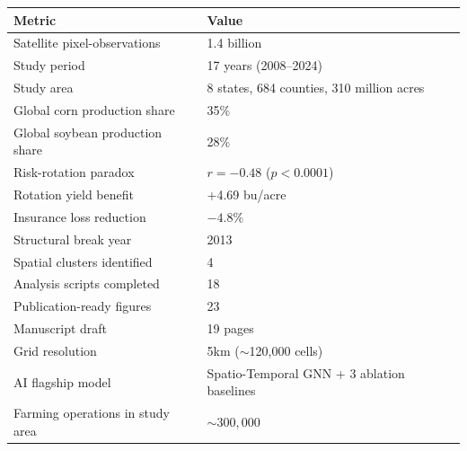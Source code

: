 \documentclass[11pt,letterpaper]{article}
\begin{document}
\begin{center}
\begin{tabular}{ll}
\toprule
\textbf{Metric} & \textbf{Value} \\
\midrule
Satellite pixel-observations & 1.4 billion \\
Study period & 17 years (2008--2024) \\
Study area & 8 states, 684 counties, 310 million acres \\
Global corn production share & 35\% \\
Global soybean production share & 28\% \\
Risk-rotation paradox & $r = -0.48$ ($p < 0.0001$) \\
Rotation yield benefit & +4.69 bu/acre \\
Insurance loss reduction & $-4.8$\% \\
Structural break year & 2013 \\
Spatial clusters identified & 4 \\
Analysis scripts completed & 18 \\
Publication-ready figures & 23 \\
Manuscript draft & 19 pages \\
Grid resolution & 5km (${\sim}$120,000 cells) \\
AI flagship model & Spatio-Temporal GNN + 3 ablation baselines \\
Farming operations in study area & ${\sim}300{,}000$ \\
\bottomrule
\end{tabular}
\end{center}
\end{document}
